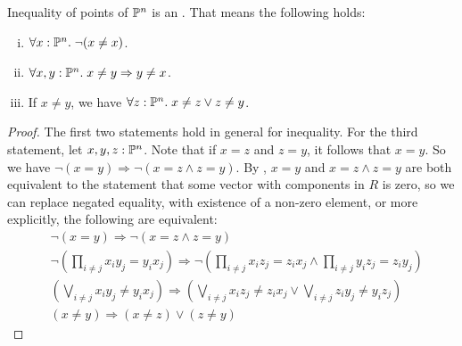 \begin{lemma}%
  \label{projective-space-apartness-relation}
  Inequality of points of $\mathbb{P}^n$ is an .
  That means the following holds:
  \begin{enumerate}[(i)]
  \item $\forall x:\mathbb{P}^n.\; \lnot (x\neq x)$.
  \item $\forall x,y:\mathbb{P}^n.\; x\neq y\Rightarrow y\neq x$.
  \item If $x\neq y$, we have $\forall z:\mathbb{P}^n.\; x\neq z \vee z\neq y$.
  \end{enumerate}
\end{lemma}

\begin{proof}
  The first two statements hold in general for inequality.
  For the third statement, let $x,y,z:\mathbb{P}^n$.
  Note that if $x=z$ and $z=y$, it follows that $x=y$.
  So we have $\neg (x=y)\Rightarrow \neg (x=z\wedge z=y)$.
  By , $x=y$ and $x=z\wedge z=y$
  are both equivalent to the statement that some vector with components in $R$ is zero,
  so we can replace negated equality, with existence of a non-zero element,
  or more explicitly, the following are equivalent:
  \begin{align*}
    &\neg (x=y)\Rightarrow \neg (x=z\wedge z=y) \\
    &\neg \left(\prod_{i\neq j}x_iy_j=y_ix_j\right)
       \Rightarrow \neg \left(\prod_{i\neq j}x_iz_j=z_ix_j \wedge \prod_{i\neq j}y_iz_j=z_iy_j \right) \\
    & \left(\bigvee_{i\neq j}x_iy_j\neq y_ix_j\right) \Rightarrow \left(\bigvee_{i\neq j}x_iz_j\neq z_ix_j
       \vee \bigvee_{i\neq j}z_iy_j\neq y_iz_j\right) \\
    & (x\neq y) \Rightarrow (x\neq z) \vee (z\neq y)
  \end{align*}
\end{proof}

